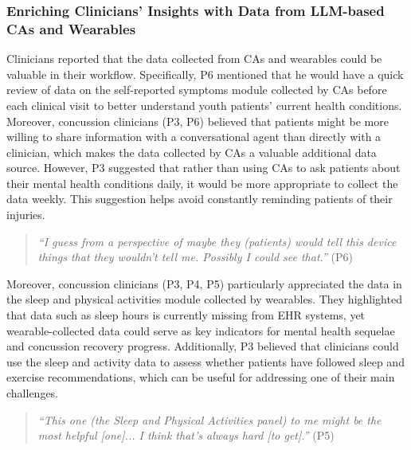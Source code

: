 \subsubsection{Enriching Clinicians' Insights with Data from LLM-based CAs and Wearables}
\label{subsubsec:cawearables}
Clinicians reported that the data collected from CAs and wearables could be valuable in their workflow. 
Specifically, P6 mentioned that he would have a quick review of data on the self-reported symptoms module collected by CAs before each clinical visit to better understand youth patients' current health conditions. 
Moreover, concussion clinicians (P3, P6) believed that patients might be more willing to share information with a conversational agent than directly with a clinician, which makes the data collected by CAs a valuable additional data source. 
However, P3 suggested that rather than using CAs to ask patients about their mental health conditions daily, it would be more appropriate to collect the data weekly. This suggestion helps avoid constantly reminding patients of their injuries.
\begin{quote}
    \textit{``I guess from a perspective of maybe they (patients) would tell this device things that they wouldn't tell me. Possibly I could see that.''} (P6)
\end{quote}
Moreover, concussion clinicians (P3, P4, P5) particularly appreciated the data in the sleep and physical activities module collected by wearables. They highlighted that data such as sleep hours is currently missing from EHR systems, yet wearable-collected data could serve as key indicators for mental health sequelae and concussion recovery progress. 
Additionally, P3 believed that clinicians could use the sleep and activity data to assess whether patients have followed sleep and exercise recommendations, which can be useful for addressing one of their main challenges.
\begin{quote}
    \textit{``This one (the Sleep and Physical Activities panel) to me might be the most helpful [one]... I think that's always hard [to get].''} (P5)
\end{quote}



